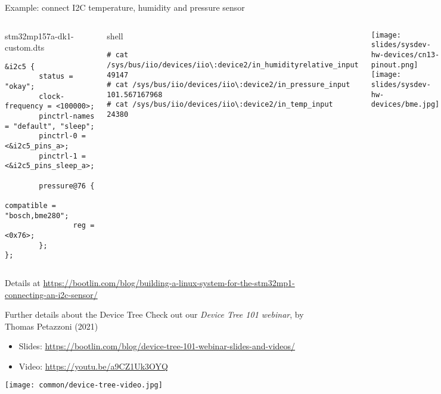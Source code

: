 \begin{frame}[fragile]{Example: connect I2C temperature, humidity and pressure sensor}
  \begin{columns}
    \begin{block}{stm32mp157a-dk1-custom.dts}
      {\tiny
\begin{verbatim}
&i2c5 {
        status = "okay";
        clock-frequency = <100000>;
        pinctrl-names = "default", "sleep";
        pinctrl-0 = <&i2c5_pins_a>;
        pinctrl-1 = <&i2c5_pins_sleep_a>;

        pressure@76 {
                compatible = "bosch,bme280";
                reg = <0x76>;
        };
};
\end{verbatim}
}
  \end{block}

\begin{block}{shell}
{\tiny
\begin{verbatim}
# cat /sys/bus/iio/devices/iio\:device2/in_humidityrelative_input
49147
# cat /sys/bus/iio/devices/iio\:device2/in_pressure_input
101.567167968
# cat /sys/bus/iio/devices/iio\:device2/in_temp_input
24380
\end{verbatim}
}
\end{block}
  \begin{center}
    \texttt{[image: slides/sysdev-hw-devices/cn13-pinout.png]}\\
    \texttt{[image: slides/sysdev-hw-devices/bme.jpg]}
  \end{center}
\end{columns}
\vspace{0.5cm}
Details at
\url{https://bootlin.com/blog/building-a-linux-system-for-the-stm32mp1-connecting-an-i2c-sensor/}
\end{frame}

\begin{frame}{Further details about the Device Tree}
\small
Check out our {\em Device Tree 101 webinar}, by Thomas Petazzoni (2021)
\begin{itemize}
    \item Slides: \url{https://bootlin.com/blog/device-tree-101-webinar-slides-and-videos/}\\
    \item Video: \url{https://youtu.be/a9CZ1Uk3OYQ}
\end{itemize}
\vspace{0.5cm}
\texttt{[image: common/device-tree-video.jpg]}
\end{frame}

